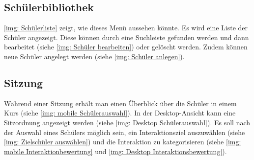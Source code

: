 \subsection{Schülerbibliothek}
\autoref{img: Schülerliste} zeigt, wie dieses Menü aussehen könnte. Es wird eine Liste der Schüler angezeigt. Diese können durch eine Suchleiste gefunden werden und dann bearbeitet (siehe \autoref{img: Schüler bearbeiten}) oder gelöscht werden. Zudem können neue Schüler angelegt werden (siehe \autoref{img: Schüler anlegen}).
\begin{figure}[H]
\begin{minipage}{.5\textwidth}
    \centering
    
    \label{img: Schülerliste}
\end{minipage}
\begin{minipage}{.5\textwidth}
 \centering
    
    \label{img: Schüler bearbeiten}
\end{minipage}%
\end{figure}
\begin{figure}[H]
    \centering
    
    \label{img: Schüler anlegen}
\end{figure}

\subsection{Sitzung}
Während einer Sitzung erhält man einen Überblick über die Schüler in einem Kurs (siehe \autoref{img: mobile Schülerauswahl}). In der Desktop-Ansicht kann eine Sitzordnung angezeigt werden (siehe \autoref{img: Desktop Schülerauswahl}). Es soll nach der Auswahl eines Schülers möglich sein, ein Interaktionsziel auszuwählen (siehe \autoref{img: Zielschüler auswählen}) und die Interaktion zu kategorisieren (siehe \autoref{img: mobile Interaktionbewertung} und \autoref{img: Desktop Interaktionsbewertung}).

\begin{figure}[H]
\begin{minipage}{.5\textwidth}
    \centering
    
    \label{img: mobile Schülerauswahl}
\end{minipage}
\begin{minipage}{.5\textwidth}
 \centering
    
    \label{img: Zielschüler auswählen}
\end{minipage}%
\end{figure}

